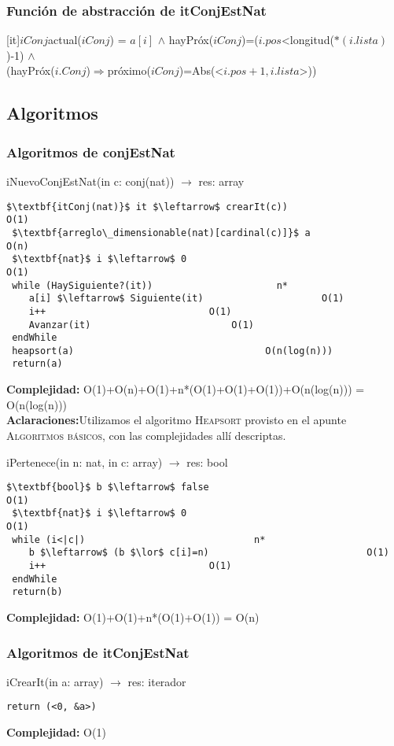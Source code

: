   \subsubsection{Funci\'on de abstracci\'on de itConjEstNat}
	
	[it]{$iConj$}{actual($iConj$) = $a[i]$ $\land$ hayPr\'ox($iConj$)=($i.pos$<longitud($*(i.lista)$)-1) $\land$ \\(hayPr\'ox($i.Conj$)$\Rightarrow$pr\'oximo($iConj$)=Abs(<$i.pos+1, i.lista$>))}
	
\subsection{Algoritmos}
\subsubsection{Algoritmos de conjEstNat}
iNuevoConjEstNat(in c: conj(nat)) $\rightarrow$ res: array
\begin{lstlisting}[mathescape]
 $\textbf{itConj(nat)}$ it $\leftarrow$ crearIt(c))								O(1)
 $\textbf{arreglo\_dimensionable(nat)[cardinal(c)]}$ a										O(n)
 $\textbf{nat}$ i $\leftarrow$ 0										O(1)
 while (HaySiguiente?(it))						n*
 	a[i] $\leftarrow$ Siguiente(it)						O(1)
 	i++								O(1)
 	Avanzar(it)							O(1)
 endWhile
 heapsort(a)						  		  O(n(log(n)))
 return(a)
\end{lstlisting}
\textbf{Complejidad:} O(1)+O(n)+O(1)+n*(O(1)+O(1)+O(1))+O(n(log(n))) = O(n(log(n)))\\
\textbf{Aclaraciones:}Utilizamos el algoritmo \textsc{Heapsort} provisto en el apunte \textsc{Algoritmos b\'asicos}, con las complejidades all\'i descriptas.


iPertenece(in n: nat, in c: array) $\rightarrow$ res: bool
\begin{lstlisting}[mathescape]
 $\textbf{bool}$ b $\leftarrow$ false									O(1)
 $\textbf{nat}$ i $\leftarrow$ 0										O(1)
 while (i<|c|)								n*
 	b $\leftarrow$ (b $\lor$ c[i]=n)							O(1)
 	i++								O(1)
 endWhile
 return(b)
\end{lstlisting}
\textbf{Complejidad:} O(1)+O(1)+n*(O(1)+O(1)) = O(n)\\

\subsubsection{Algoritmos de itConjEstNat}
iCrearIt(in a: array) $\rightarrow$ res: iterador
\begin{lstlisting}[mathescape]
 return (<0, &a>)
\end{lstlisting}
\textbf{Complejidad:} O(1)\\

